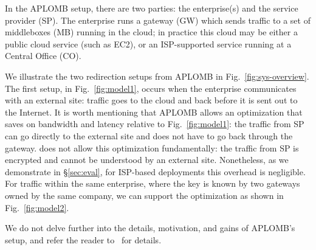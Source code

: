 In the APLOMB setup, there are two parties: the enterprise(s) and the service provider (SP).
The enterprise runs a gateway (GW) which sends traffic to a set of middleboxes (MB) running in the cloud; in practice this cloud may be either a public cloud service (such as EC2), or an ISP-supported service running at a Central Office (CO).

We illustrate the two redirection setups from APLOMB in Fig.~\ref{fig:sys-overview}.  The first setup, in Fig.~\ref{fig:model1},  occurs when the enterprise communicates with an external site: traffic goes to the cloud and back before it is sent out to the Internet. 
It is worth mentioning that APLOMB allows an optimization that saves on bandwidth and latency relative to Fig.~\ref{fig:model1}: the traffic from SP can go directly to the external site and does not have to go back through the gateway. \sys does not allow this optimization fundamentally: the traffic from SP is encrypted and cannot be understood by an external site. 
Nonetheless, as we demonstrate in \S\ref{sec:eval}, for ISP-based deployments this overhead is negligible.
For traffic within the same enterprise, where the key is known by two gateways owned by the same company, we can support the optimization as shown in Fig.~\ref{fig:model2}.

We do not delve further into the details, motivation, and gains of APLOMB's setup, and refer the reader to~\cite{aplomb} for details. 

%
%
%
%
%
%

